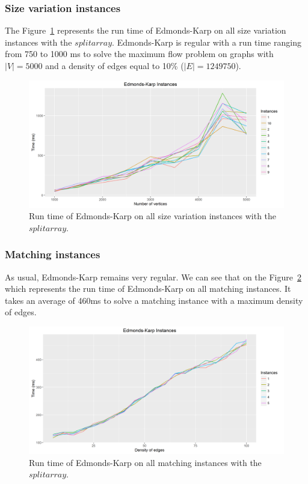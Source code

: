 \subsubsection{Size variation instances}
The Figure~\ref{fig:EKmeansize} represents the run time of Edmonds-Karp on all size variation instances with the $split array$. Edmonds-Karp is regular with a run time ranging from 750 to 1000 ms to solve the maximum flow problem on graphs with $|V|=5000$ and a density of edges equal to 10\% ($|E|=1249750$).
\begin{figure}[H]
\begin{center}
\includegraphics[scale=0.5]{images/EKmeansize.png}
\caption{Run time of Edmonds-Karp on all size variation instances with the $split array$.}
\label{fig:EKmeansize}
\end{center}
\end{figure}
\subsubsection{Matching instances}
As usual, Edmonds-Karp remains very regular. We can see that on the Figure~\ref{fig:ekmatching} which represents the run time of Edmonds-Karp on all matching instances. It takes an average of 460ms to solve a matching instance with a maximum density of edges.
\begin{figure}[H]
\begin{center}
\includegraphics[scale=0.5]{images/ekmatching.png}
\caption{Run time of Edmonds-Karp on all matching instances with the $split array$.}
\label{fig:ekmatching}
\end{center}
\end{figure}
